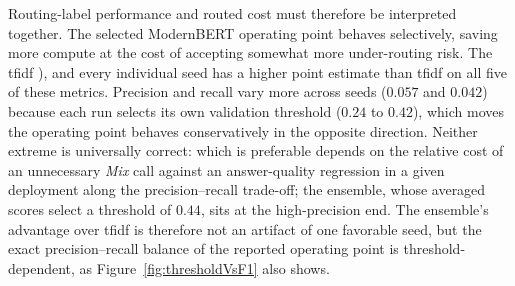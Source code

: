 \documentclass[english, bibtex]{kththesis}               %
\numberwithin{listing}{chapter}
\providecommand{\DIFaddtex}[1]{{\protect\color{blue} \sf #1}} %
\providecommand{\DIFdeltex}[1]{{\protect\color{red} \scriptsize #1}} %
\providecommand{\DIFaddbegin}{} %
\providecommand{\DIFaddend}{} %
\providecommand{\DIFdelbegin}{} %
\providecommand{\DIFdelend}{} %
\providecommand{\DIFadd}[1]{\texorpdfstring{\DIFaddtex{#1}}{#1}} %
\providecommand{\DIFdel}[1]{\texorpdfstring{\DIFdeltex{#1}}{}} %
\begin{document}
\DIFdel{Routing-label performance and routed cost must therefore be interpreted together. The selected ModernBERT operating point behaves selectively, saving more compute at the cost of accepting somewhat more under-routing risk. The \gls{tfidf} }\DIFdelend \DIFaddbegin \DIFadd{), and every individual seed has a higher point estimate than \gls{tfidf} on all five of these metrics. Precision and recall vary more across seeds ($0.057$ and $0.042$) because each run selects its own validation threshold ($0.24$ to $0.42$), which moves the }\DIFaddend operating point \DIFdelbegin \DIFdel{behaves conservatively in the opposite direction. Neither extreme is universally correct: which is preferable depends on the relative cost of an unnecessary \emph{Mix} call against an answer-quality regression in a given deployment}\DIFdelend \DIFaddbegin \DIFadd{along the precision--recall trade-off; the ensemble, whose averaged scores select a threshold of $0.44$, sits at the high-precision end. The ensemble's advantage over \gls{tfidf} is therefore not an artifact of one favorable seed, but the exact precision--recall balance of the reported operating point is threshold-dependent, as Figure~\ref{fig:thresholdVsF1} also shows.
}
\end{document}
